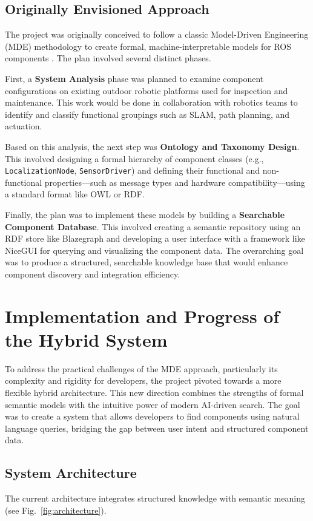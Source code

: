 \documentclass[rnd]{mas_proposal}
\begin{document}
\subsection{Originally Envisioned Approach}
The project was originally conceived to follow a classic Model-Driven Engineering (MDE) methodology to create formal, machine-interpretable models for ROS components \citep{hammoudeh2019bootstrapping, zander2016model, brugali2015model}. The plan involved several distinct phases.

First, a \textbf{System Analysis} phase was planned to examine component configurations on existing outdoor robotic platforms used for inspection and maintenance. This work would be done in collaboration with robotics teams to identify and classify functional groupings such as SLAM, path planning, and actuation.

Based on this analysis, the next step was \textbf{Ontology and Taxonomy Design}. This involved designing a formal hierarchy of component classes (e.g., \texttt{LocalizationNode}, \texttt{SensorDriver}) and defining their functional and non-functional properties—such as message types and hardware compatibility—using a standard format like OWL or RDF.

Finally, the plan was to implement these models by building a \textbf{Searchable Component Database}. This involved creating a semantic repository using an RDF store like Blazegraph and developing a user interface with a framework like NiceGUI for querying and visualizing the component data. The overarching goal was to produce a structured, searchable knowledge base that would enhance component discovery and integration efficiency.

\section{Implementation and Progress of the Hybrid System}
To address the practical challenges of the MDE approach, particularly its complexity and rigidity for developers, the project pivoted towards a more flexible hybrid architecture. This new direction combines the strengths of formal semantic models with the intuitive power of modern AI-driven search. The goal was to create a system that allows developers to find components using natural language queries, bridging the gap between user intent and structured component data.

\subsection{System Architecture}
The current architecture integrates structured knowledge with semantic meaning (see Fig.~\ref{fig:architecture}).
\end{document}
